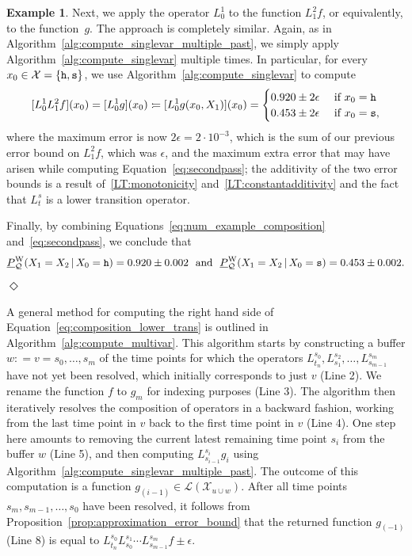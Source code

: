\documentclass[10pt,a4paper]{paper}
\theoremstyle{definition}
\newtheorem{exmp}{Example}
\newcommand{\states}{\mathcal{X}}
\newcommand{\gambles}{\mathcal{L}}
\newcommand{\rateset}{\mathcal{Q}}
\newcommand{\coloneqq}{:\!=}
\newcommand{\exampleend}{\hfill$\Diamond$}
\begin{document}
\begin{exmp}
Next, we apply the operator $L_0^1$ to the function $L_1^2f$, or equivalently, to the function~$g$. The approach is completely similar. Again, as in Algorithm~\ref{alg:compute_singlevar_multiple_past}, we simply apply Algorithm~\ref{alg:compute_singlevar} multiple times. In particular, for every $x_0\in\states=\{{\tt h},{\tt s}\}$, we use Algorithm~\ref{alg:compute_singlevar} to compute
\begin{equation}\label{eq:secondpass}
[L_0^1L_1^2f](x_0)
=[L_0^1g](x_0)
\coloneqq
[L_0^1 g(x_0,X_1)](x_0)
=
\begin{cases}
0.920\pm2\epsilon
&\text{ if $x_0={\tt h}$}\\
0.453\pm2\epsilon
&\text{ if $x_0={\tt s}$},
\end{cases}
\end{equation}
where the maximum error is now $2\epsilon=2\cdot10^{-3}$, which is the sum of our previous error bound on $L_1^2f$, which was $\epsilon$, and the maximum extra error that may have arisen while computing Equation~\eqref{eq:secondpass}; the additivity of the two error bounds is a result of~\ref{LT:monotonicity} and~\ref{LT:constantadditivity} and the fact that $L_t^s$ is a lower transition operator.


Finally, by combining Equations~\eqref{eq:num_example_composition} and~\eqref{eq:secondpass}, we conclude that
\begin{align*}
\underline{P}_{\rateset}^{\mathrm{W}}(X_1 = X_2\,\vert\,X_0=\text{{\tt h}})=0.920\pm0.002~~\text{and}~~\underline{P}_{\rateset}^{\mathrm{W}}(X_1 = X_2\,\vert\,X_0=\text{{\tt s}})=0.453\pm0.002.
\end{align*}
\exampleend
\end{exmp}

A general method for computing the right hand side of Equation~\eqref{eq:composition_lower_trans} is outlined in Algorithm~\ref{alg:compute_multivar}. This algorithm starts by constructing a buffer $w\coloneqq v=s_0,\ldots,s_m$ of the time points for which the operators $L_{t_n}^{s_0},L_{s_1}^{s_2},\ldots,L_{s_{m-1}}^{s_m}$ have not yet been resolved, which initially corresponds to just $v$ (Line 2). We rename the function $f$ to $g_m$ for indexing purposes (Line 3). The algorithm then iteratively resolves the composition of operators in a backward fashion, working from the last time point in $v$ back to the first time point in $v$ (Line 4). One step here amounts to removing the current latest remaining time point $s_i$ from the buffer $w$ (Line 5), and then computing $L_{s_{i-1}}^{s_i}g_i$ using Algorithm~\ref{alg:compute_singlevar_multiple_past}. The outcome of this computation is a function $g_{(i-1)}\in\gambles(\states_{u\cup w})$.
After all time points $s_m,s_{m-1},\ldots,s_0$ have been resolved, it follows from Proposition~\ref{prop:approximation_error_bound} that the returned function $g_{(-1)}$ (Line 8) is equal to $L_{t_n}^{s_0}L_{s_0}^{s_1}\cdots L_{s_{m-1}}^{s_m}f\pm\epsilon$.
\end{document}
